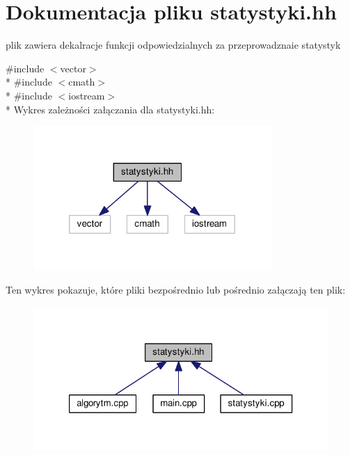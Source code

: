 \hypertarget{statystyki_8hh}{\section{Dokumentacja pliku statystyki.\-hh}
\label{statystyki_8hh}
}


plik zawiera dekalracje funkcji odpowiedzialnych za przeprowadznaie statystyk  


{\ttfamily \#include $<$vector$>$}\\*
{\ttfamily \#include $<$cmath$>$}\\*
{\ttfamily \#include $<$iostream$>$}\\*
Wykres zależności załączania dla statystyki.\-hh\-:\nopagebreak
\begin{figure}[H]
\begin{center}
\leavevmode
\includegraphics[width=257pt]{statystyki_8hh__incl}
\end{center}
\end{figure}
Ten wykres pokazuje, które pliki bezpośrednio lub pośrednio załączają ten plik\-:\nopagebreak
\begin{figure}[H]
\begin{center}
\leavevmode
\includegraphics[width=323pt]{statystyki_8hh__dep__incl}
\end{center}
\end{figure}
